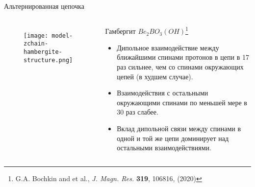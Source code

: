 \begin{frame}{Альтернированная цепочка}
\begin{columns}

    \begin{figure}
      \texttt{[image: model-zchain-hambergite-structure.png]}
      \caption{}
    \end{figure}

    \begin{block}{Гамбергит $Be_2BO_3(OH)$\footnote[frame]{
        G.A. Bochkin and et al., \textit{J. Magn. Res.} \textbf{319}, 106816, (2020)} }
        \begin{itemize}
            \item Дипольное взаимодействие между ближайшими спинами протонов в цепи в 17 раз сильнее, чем со спинами окружающих цепей (в худшем случае).
            \item Взаимодействия с остальными окружающими спинами по меньшей мере в 30 раз слабее.
            \item Вклад дипольной связи между спинами в одной и той же цепи доминирует над остальными взаимодействиями.
        \end{itemize}
    \end{block}

\end{columns}
\end{frame}
